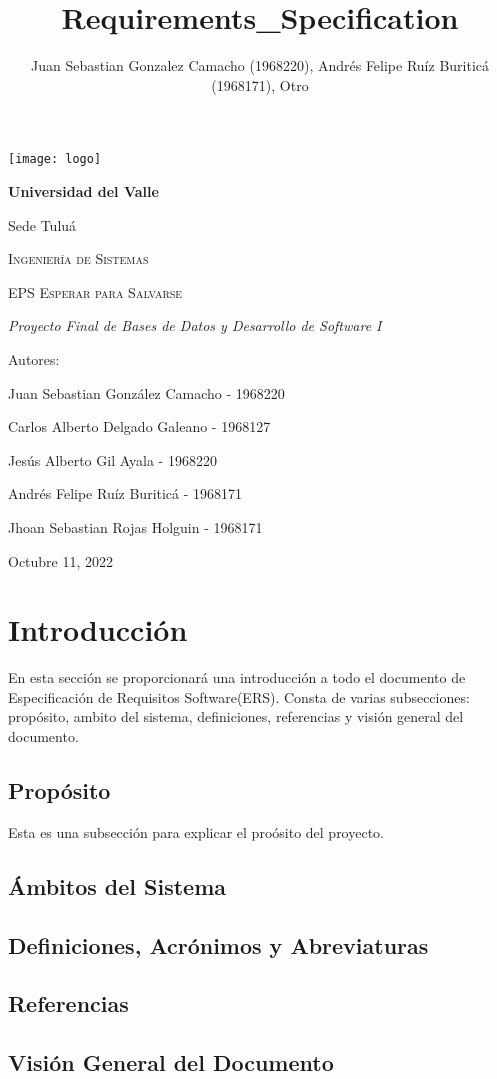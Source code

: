 \documentclass[12pt,a4paper]{article}
\author{Juan Sebastian Gonzalez Camacho (1968220), Andrés Felipe Ruíz Buriticá (1968171), Otro}
\title{Requirements_Specification}
\begin{document}
\begin{titlepage}
\centering
{\texttt{[image: logo]} \par}
\vfill
{\bfseries\LARGE Universidad del Valle\par}
{\Large Sede Tuluá\par}
\vfill
{\scshape\Large Ingeniería de Sistemas \par}
\vfill
{\scshape\Huge EPS Esperar para Salvarse \par}
\vfill
{\itshape\Large Proyecto Final de Bases de Datos y Desarrollo de Software I \par}
\vfill
{\Large Autores: \par}
{\Large Juan Sebastian González Camacho - 1968220 \par}
{\Large Carlos Alberto Delgado Galeano - 1968127 \par}
{\Large Jesús Alberto Gil Ayala - 1968220 \par}
{\Large Andrés Felipe Ruíz Buriticá - 1968171 \par}
{\Large Jhoan Sebastian Rojas Holguin - 1968171 \par}
\vfill
{\Large Octubre 11, 2022 \par}
\end{titlepage}
\tableofcontents
\newpage
\section{Introducción}
En esta sección se proporcionará una introducción a todo el documento de Especificación de Requisitos Software(ERS). Consta de varias subsecciones: propósito, ambito del sistema, definiciones, referencias y visión general del documento.
\subsection{Propósito}
Esta es una subsección para explicar el proósito del proyecto.
\subsection{Ámbitos del Sistema}
\subsection{Definiciones, Acrónimos y Abreviaturas}
\subsection{Referencias}
\subsection{Visión General del Documento}
\end{document}
